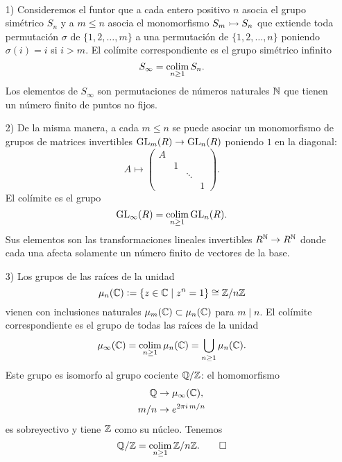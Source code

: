 \documentclass{article}
\numberwithin{equation}{section}
\theoremstyle{definition}
\begin{document}
\begin{ejemplo}
  ~

  \begin{enumerate}
  \item[1)] Consideremos el funtor que a cada entero positivo $n$ asocia el
    grupo simétrico $S_n$ y a $m\le n$ asocia el monomorfismo $S_m \rightarrowtail S_n$
    que extiende toda permutación $\sigma$ de $\{ 1,2,\ldots,m \}$ a una
    permutación de $\{ 1,2,\ldots,n \}$ poniendo $\sigma (i) = i$ si $i > m$. El
    colímite correspondiente es el grupo simétrico infinito
    $$S_\infty = \operatorname*{co{\lim}}_{n\ge 1} S_n.$$
    Los elementos de $S_\infty$ son permutaciones de números naturales $\mathbb{N}$ que
    tienen un número finito de puntos no fijos.

  \item[2)] De la misma manera, a cada $m \le n$ se puede asociar un
    monomorfismo de grupos de matrices invertibles $\operatorname{GL}_m (R) \to \operatorname{GL}_n (R)$
    poniendo $1$ en la diagonal:
    $$A \mapsto \begin{pmatrix}
      A \\
      & 1 \\
      && \ddots \\
      &&& 1
    \end{pmatrix}.$$
    El colímite es el grupo
    $$\operatorname{GL}_\infty (R) = \operatorname*{co{\lim}}_{n\ge 1} \operatorname{GL}_n (R).$$
    Sus elementos son las transformaciones lineales invertibles
    $R^{\mathbb{N}} \to R^{\mathbb{N}}$ donde cada una afecta solamente un número finito de
    vectores de la base.

  \item[3)] Los grupos de las raíces de la unidad
    $$\mu_n (\mathbb{C}) \mathrel{\mathop:}= \{ z\in \mathbb{C} \mid z^n = 1 \} \cong \mathbb{Z}/n\mathbb{Z}$$
    vienen con inclusiones naturales $\mu_m (\mathbb{C}) \subset \mu_n (\mathbb{C})$ para
    $m\mid n$. El colímite correspondiente es el grupo de todas las raíces de la
    unidad
    $$\mu_\infty (\mathbb{C}) = \operatorname*{co{\lim}}_{n\ge 1} \mu_n (\mathbb{C}) = \bigcup_{n\ge 1} \mu_n (\mathbb{C}).$$
    Este grupo es isomorfo al grupo cociente $\mathbb{Q}/\mathbb{Z}$: el homomorfismo
    \begin{align*}
      \mathbb{Q} & \to \mu_\infty (\mathbb{C}),\\
      m/n & \to e^{2\pi i\,m/n}
    \end{align*}
    es sobreyectivo y tiene $\mathbb{Z}$ como su núcleo. Tenemos
    \[ \mathbb{Q}/\mathbb{Z} = \operatorname*{co{\lim}}_{n\ge 1} \mathbb{Z}/n\mathbb{Z}. \qedhere \]
  \end{enumerate}
\end{ejemplo}
\end{document}
